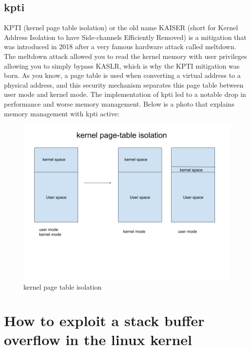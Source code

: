    \subsection{kpti}
    KPTI (kernel page table isolation) or the old name KAISER (short for Kernel Address Isolation to have Side-channels Efficiently Removed) is a mitigation that was introduced in 2018 after a very famous hardware attack called meltdown.\newline
    The meltdown attack allowed you to read the kernel memory with user privileges allowing you to simply bypass KASLR, which is why the KPTI mitigation was born.\newline
    As you know, a page table is used when converting a virtual address to a physical address, and this security mechanism separates this page table between user mode and kernel mode.\newline
    The implementation of kpti led to a notable drop in performance and worse memory management.\newline
    Below is a photo that explains memory management with kpti active: \newline
    \begin{figure}[htbp]
        \centering
        \includegraphics[width=1\linewidth]{Images/kpti.png}
        \caption{kernel page table isolation}
        \label{fig:enter-label}
    \end{figure}
    \clearpage
    \section{How to exploit a stack buffer overflow in the linux kernel}

